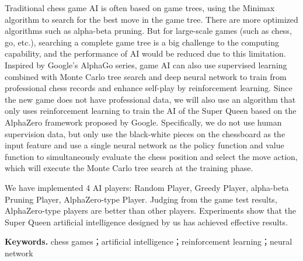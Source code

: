 Traditional chess game AI is often based on game trees, using the Minimax algorithm to search for the best move in the game tree. There are more optimized algorithms such as alpha-beta pruning. But for large-scale games (such as chess, go, etc.), searching a complete game tree is a big challenge to the computing capability, and the performance of AI would be reduced due to this limitation. 
Inspired by Google's AlphaGo series, game AI can also use supervised learning combined with Monte Carlo tree search and deep neural network to train from professional chess records and enhance self-play by reinforcement learning. Since the new game does not have professional data, we will also use an algorithm that only uses reinforcement learning to train the AI of the Super Queen based on the AlphaZero framework proposed by Google. 
Specifically, we do not use human supervision data, but only use the black-white pieces on the chessboard as the input feature and use a single neural network as the policy function and value function to simultaneously evaluate the chess position and select the move action, which will execute the Monte Carlo tree search at the training phase.


We have implemented 4 AI players: Random Player, Greedy Player, alpha-beta Pruning Player, AlphaZero-type Player. Judging from the game test results, AlphaZero-type players are better than other players. Experiments show that the Super Queen artificial intelligence designed by us has achieved effective results.

\noindent\textbf{Keywords.} chess games；artificial intelligence；reinforcement learning；neural network

